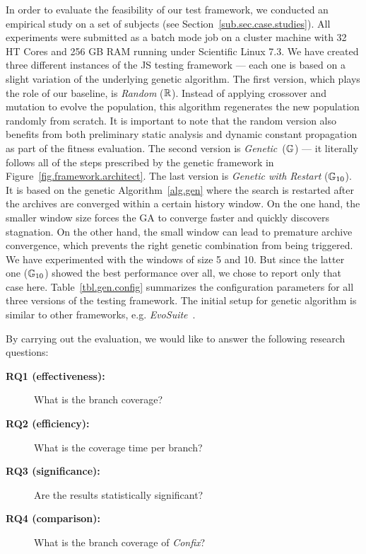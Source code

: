 In order to evaluate the feasibility of our test framework, we conducted an empirical study on a set of subjects (see Section~\ref{sub.sec.case.studies}). All experiments were submitted as a batch mode job on a cluster machine with 32 HT Cores and 256 GB RAM running under Scientific Linux 7.3. We have created three different instances of the JS testing framework --- each one is based on a slight variation of the underlying genetic algorithm. The first version, which plays the role of our baseline, is \emph{Random} ($\mathbb{R}$). Instead of applying crossover and mutation to evolve the population, this algorithm regenerates the new population randomly from scratch. It is important to note  that the random version also benefits from both preliminary static analysis and dynamic constant propagation as part of the fitness evaluation. The second version is \emph{Genetic}~($\mathbb{G}$) --- it literally follows all of the steps prescribed by the genetic framework in Figure~\ref{fig.framework.architect}. The last version is \emph{Genetic with Restart} ($\mathbb{G}_{10}$). It is based on the genetic Algorithm~\ref{alg.gen} where the search is restarted after the archives are converged within a certain history window. On the one hand, the smaller window size forces the GA to converge faster and quickly discovers stagnation. On the other hand, the small window can lead to premature archive convergence, which prevents the right genetic combination from being triggered. We have experimented with the windows of size 5 and 10. But since the latter one ($\mathbb{G}_{10}$) showed the best performance over all, we chose to report only that case here. Table~\ref{tbl.gen.config} summarizes the configuration parameters for all three versions of the testing framework. The initial setup for genetic algorithm is similar to other frameworks, e.g. \emph{EvoSuite}~\cite{fraser2011evosuite}.

By carrying out the evaluation, we would like to answer the following research questions:
\begin{description}
\item[\textbf{RQ1 (effectiveness):}] What is the branch coverage?
\item[\textbf{RQ2 (efficiency):}] What is the coverage time per branch?
\item[\textbf{RQ3 (significance):}] Are the results statistically significant?
\item[\textbf{RQ4 (comparison):}] What is the branch coverage of \emph{Confix}?
\end{description}


